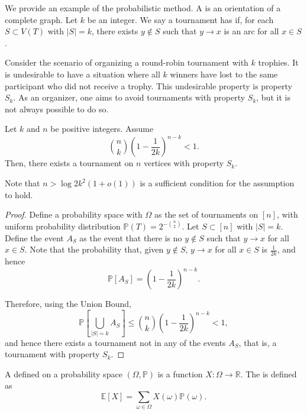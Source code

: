 We provide an example of the probabilistic method.
A  is an orientation of a complete graph.
Let \(k\) be an integer.
We say a tournament has  if,
for each \(S \subset V(T)\) with \(|S| = k\), 
there exists \(y \notin S\) such that \(y \to x\) is an arc for all \(x \in S\).

Consider the scenario of organizing a round-robin tournament with \(k\) trophies.
It is undesirable to have a situation where all \(k\) winners have lost to the same participant who did not receive a trophy.
This undesirable property is property \(S_k\).
As an organizer, one aims to avoid tournaments with property \(S_k\), but it is not always possible to do so.

\begin{theorem}
    Let \(k\) and \(n\) be positive integers.
    Assume
    \begin{equation}
        \binom{n}{k} \left( 1 - \frac{1}{2k} \right)^{n-k} < 1.
    \end{equation}
    Then, there exists a tournament on \(n\) vertices with property \(S_k\).
\end{theorem}

Note that \(n > \log 2 k^2 (1 + o(1))\) is a sufficient condition for the assumption to hold.

\begin{proof}
    Define a probability space with \(\Omega\) as the set of tournaments on \([n]\),
    with uniform probability distribution \(\mathbb{P}(T) = 2^{-\binom{n}{2}}\).
    Let \(S \subset [n]\) with \(|S| = k\).
    Define the event \(A_S\) as the event that there is no \(y \notin S\) such that \(y \to x\) for all \(x \in S\).
    Note that the probability that, given \(y \notin S\), \(y \to x\) for all \(x \in S\) is \(\frac{1}{2k}\), and hence
    \begin{equation}
        \mathbb{P}[A_S] = \left( 1 - \frac{1}{2k} \right)^{n-k}.
    \end{equation}

    Therefore, using the Union Bound,
    \begin{equation}
        \mathbb{P}\left[ \bigcup_{|S| = k} A_S \right] \leq \binom{n}{k} \left( 1 - \frac{1}{2k} \right)^{n-k} < 1,
    \end{equation}
    and hence there exists a tournament not in any of the events \(A_S\), that is, a tournament with property \(S_k\).
\end{proof}

\begin{definition}
    A  defined on a probability space \((\Omega, \mathbb{P})\) is a function \(X : \Omega \to \mathbb{R}\).
    The  is defined as
    \begin{equation}
        \mathbb{E}[X] = \sum_{\omega \in \Omega} X(\omega) \mathbb{P}(\omega).
    \end{equation}
\end{definition}

